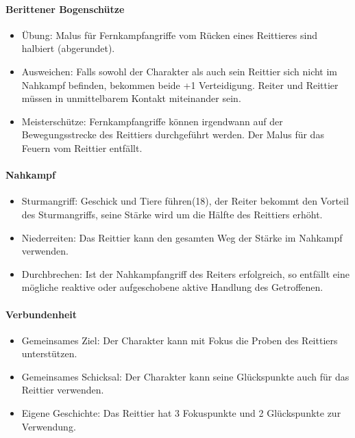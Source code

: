 \documentclass{article}
\begin{document}
\paragraph{Berittener Bogenschütze}

\begin{itemize}
\item Übung: Malus für Fernkampfangriffe vom Rücken eines Reittieres sind halbiert (abgerundet).
\item Ausweichen: Falls sowohl der Charakter als auch sein Reittier sich nicht im Nahkampf befinden, bekommen beide +1 Verteidigung. Reiter und Reittier müssen in unmittelbarem Kontakt miteinander sein.
\item Meisterschütze: Fernkampfangriffe können irgendwann auf der Bewegungsstrecke des Reittiers durchgeführt werden. Der Malus für das Feuern vom Reittier entfällt.
\end{itemize}

\paragraph{Nahkampf}

\begin{itemize}
\item Sturmangriff: Geschick und Tiere führen(18), der Reiter bekommt den Vorteil des Sturmangriffs, seine Stärke wird um die Hälfte des Reittiers erhöht.
\item Niederreiten: Das Reittier kann den gesamten Weg der Stärke im Nahkampf verwenden.
\item Durchbrechen: Ist der Nahkampfangriff des Reiters erfolgreich, so entfällt eine mögliche reaktive oder aufgeschobene aktive Handlung des Getroffenen.
\end{itemize}

\paragraph{Verbundenheit}

\begin{itemize}
\item Gemeinsames Ziel: Der Charakter kann mit Fokus die Proben des Reittiers unterstützen.
\item Gemeinsames Schicksal: Der Charakter kann seine Glückspunkte auch für das Reittier verwenden.
\item Eigene Geschichte: Das Reittier hat 3 Fokuspunkte und 2 Glückspunkte zur Verwendung.
\end{itemize}
\end{document}
